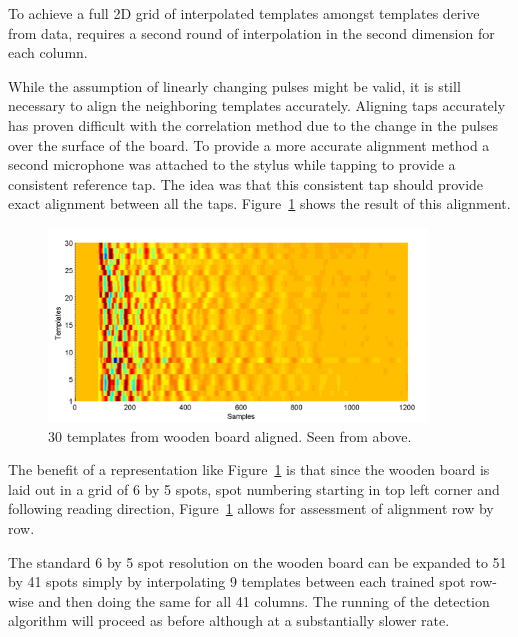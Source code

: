 To achieve a full 2D grid of interpolated templates amongst templates derive from data, requires a second round of interpolation in the second dimension for each column.

While the assumption of linearly changing pulses might be valid, it is still necessary to align the neighboring templates accurately. Aligning taps accurately has proven difficult with the correlation method due to the change in the pulses over the surface of the board. To provide a more accurate alignment method a second microphone was attached to the stylus while tapping to provide a consistent reference tap. The idea was that this consistent tap should provide exact alignment between all the taps. Figure~\ref{fig:templatesAligned} shows the result of this alignment.

\begin{figure}[!]
\centering
\includegraphics[width=380px]{templatesAligned.pdf}
\caption{30 templates from wooden board aligned. Seen from above.}\label{fig:templatesAligned}
\end{figure}

The benefit of a representation like Figure~\ref{fig:templatesAligned} is that since the wooden board is laid out in a grid of 6 by 5 spots, spot numbering starting in top left corner and following reading direction, Figure~\ref{fig:templatesAligned} allows for assessment of alignment row by row.

The standard 6 by 5 spot resolution on the wooden board can be expanded to 51 by 41 spots simply by interpolating 9 templates between each trained spot row-wise and then doing the same for all 41 columns. The running of the detection algorithm will proceed as before although at a substantially slower rate.

